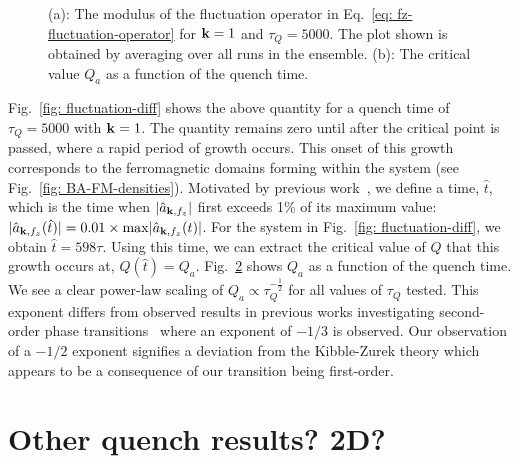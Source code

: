\begin{figure}[tb]
\begin{subfigure}{0.45\textwidth}
        \caption{}
        \label{fig: Q_a-scaling}
    \end{subfigure}
    \caption{(a): The modulus of the fluctuation operator in
    Eq.~\eqref{eq: fz-fluctuation-operator} for $\vb{k}=1$ and $\tau_Q=5000$.
    The plot shown is obtained by averaging over all runs in the ensemble.
    (b): The critical value $Q_a$ as a function of the quench time.
    }
\end{figure}
Fig.~\ref{fig: fluctuation-diff} shows the above quantity for a quench time
of $\tau_Q=5000$ with $\vb{k}=1$.
The quantity remains zero until after the critical point is passed, where
a rapid period of growth occurs.
This onset of this growth corresponds to the ferromagnetic domains forming
within the system (see Fig.~\ref{fig: BA-FM-densities}).
Motivated by previous work~\cite{Damski2007, Qiu2020}, we define a time,
$\hat{t}$, which is the time when $|\hat{a}_{\vb{k}, {f_z}}|$ first exceeds
1\% of its maximum value: $|\hat{a}_{\vb{k}, {f_z}}(\hat{t})| =
0.01\times \mathrm{max}|\hat{a}_{\vb{k}, {f_z}}(t)|$.
For the system in Fig.~\ref{fig: fluctuation-diff}, we obtain $\hat{t}=598\tau$.
Using this time, we can extract the critical value of $Q$ that this growth
occurs at, $Q(\hat{t}) = Q_a$.
Fig.~\ref{fig: Q_a-scaling} shows $Q_a$ as a function of the quench time.
We see a clear power-law scaling of $Q_a \propto \tau_Q^{-\frac{1}{2}}$ for
all values of $\tau_Q$ tested.
This exponent differs from observed results in previous works investigating
second-order phase transitions~\cite{Damski2007, Anquez2016, Swislocki2013}
where an exponent of $-1/3$ is observed.
Our observation of a $-1/2$ exponent signifies a deviation from
the Kibble-Zurek theory which appears to be a consequence of our transition
being first-order.

\section{Other quench results? 2D?}
